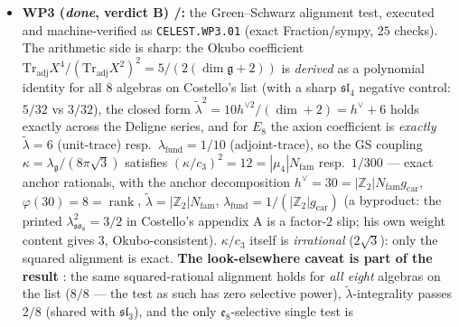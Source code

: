 \documentclass[11pt,a4paper]{article}
\newcommand{\cthree}{c_3}
\newcommand{\Nfam}{N_{\mathrm{fam}}}
\newcommand{\gcar}{g_{\mathrm{car}}}
\newcommand{\Z}{\mathbb Z}
\begin{document}
\begin{itemize}
\vref{v510} that input reads: the square-modulus datum $\tau=i$; its position half is topology;
since \vref{v512} it reads equivalently: one discrete symmetry-lift bit, flag transitivity
$\iff\tau=i$; and since \vref{v521}/\vref{v525}/\vref{v529} free OS positivity, the whole
mark-decorated free-plus-twist state class and the first genuinely interacting FK toy are
documented as the \emph{eighth}, \emph{ninth} and \emph{tenth} side-blind tests --- the bit is
not derivable from free RP/$\Theta$ existence, from any Wick-computable twist decoration or from
the FK interaction class, and remains genuine discrete input; since \vref{v528} it is the
twist-class choice, in principle interferometrically readable; and since \vref{v534} it carries
the first \emph{positive} selection datum --- reflection positivity on the interacting mark
family keeps exactly the $\delta=\pi/2$ member alive, toy-fenced).
\item \textbf{WP3 (\emph{done}, verdict B) \mE/\mC:} the Green--Schwarz alignment test, executed and
machine-verified as \texttt{CELEST.WP3.01}  (exact
Fraction/sympy, $25$ checks). The arithmetic side is sharp: the Okubo coefficient
$\mathrm{Tr}_{\mathrm{adj}}X^4/(\mathrm{Tr}_{\mathrm{adj}}X^2)^2=5/(2(\dim\mathfrak g{+}2))$ is
\emph{derived} as a polynomial identity for all $8$ algebras on Costello's list (with a sharp
$\mathfrak{sl}_4$ negative control: $5/32$ vs $3/32$), the closed form
$\tilde\lambda^2=10h^{\vee2}/(\dim{+}2)=h^\vee{+}6$ holds exactly across the Deligne series, and for $E_8$
the axion coefficient is \emph{exactly} $\tilde\lambda=6$ (unit-trace) resp.\
$\lambda_{\mathrm{fund}}=1/10$ (adjoint-trace), so the GS coupling
$\kappa=\lambda_{\mathfrak g}/(8\pi\sqrt3)$ satisfies $(\kappa/\cthree)^2=12=|\mu_4|\Nfam$ resp.\ $1/300$
--- exact anchor rationals, with the anchor decomposition $h^\vee{=}30{=}|\Z_2|\Nfam\gcar$,
$\varphi(30){=}8{=}\operatorname{rank}$, $\tilde\lambda{=}|\Z_2|\Nfam$,
$\lambda_{\mathrm{fund}}{=}1/(|\Z_2|\gcar)$ (a byproduct: the printed $\lambda^2_{\mathfrak{so}_8}=3/2$
in Costello's appendix A is a factor-$2$ slip; his own weight content gives $3$, Okubo-consistent).
$\kappa/\cthree$ itself is \emph{irrational} ($2\sqrt3$): only the squared alignment is exact. \textbf{The
look-elsewhere caveat is part of the result} \mC: the same squared-rational alignment holds for \emph{all
eight} algebras on the list ($8/8$ --- the test as such has zero selective power), $\tilde\lambda$-integrality
passes $2/8$ (shared with $\mathfrak{sl}_3$), and the only $\mathfrak e_8$-selective single test is

\end{itemize}
\end{document}

